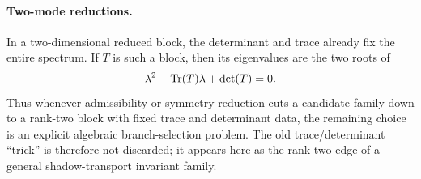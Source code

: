 \paragraph{Two-mode reductions.}
\label{rem:two-mode-reduction}
In a two-dimensional reduced block, the determinant and trace already fix the
entire spectrum. If $T$ is such a block, then its eigenvalues are the two roots
of
\[
\lambda^2-\mathrm{Tr}(T)\lambda+\det(T)=0.
\]
Thus whenever admissibility or symmetry reduction cuts a candidate family down
to a rank-two block with fixed trace and determinant data, the remaining choice
is an explicit algebraic branch-selection problem. The old trace/determinant
``trick'' is therefore not discarded; it appears here as the rank-two edge of a
general shadow-transport invariant family.
